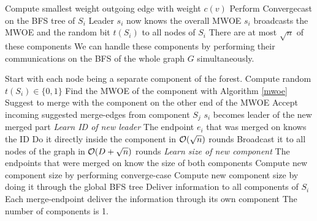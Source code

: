 \documentclass[11pt, oneside]{book}   						%
\begin{document}
\begin{algorithm}
\caption{}\label{mwoe}
\begin{algorithmic}[1]
\ForEach[Component $S_i$]
		\ForEach[node $v$]
			\State Compute smallest weight outgoing edge with weight $c(v)$
		\EndForEach
		\State Perform Convergecast on the BFS tree of $S_i$
		\State Leader $s_i$ now knows the overall MWOE
		\State $s_i$ broadcasts the MWOE and the random bit $t(S_i)$ to all nodes of $S_i$
	\Else
		\State There are at most $\sqrt{n}$ of these components
		\State We can handle these components by performing their communications on the BFS of the whole graph $G$ simultaneously.
	\EndIf
\EndForEach
\end{algorithmic}
\end{algorithm}

\begin{algorithm}[H]
\caption{}\label{boruvska}
\begin{algorithmic}[1]
\State Start with each node being a separate component of the forest.
\Repeat
		\State Compute random $t(S_i)\in \{0,1\}$
		\State Find the MWOE of the component with Algorithm \ref{mwoe}
			\State Suggest to merge with the component on the other end of the MWOE
		\Else 
			\State Accept incoming suggested merge-edges from component $S_j$
			\State $s_i$ becomes leader of the new merged part
		\EndIf
			\State\textit{Learn ID of new leader}
			\State The endpoint $e_i$ that was merged on knows the ID
				\State Do it directly inside the component in $\mathcal{O}(\sqrt{n})$ rounds
			\Else
				\State Broadcast it to all nodes of the graph in $\mathcal{O}(D+\sqrt{n})$ rounds
			\EndIf			
		\EndIf
		\State\textit{Learn size of new component}
			\State The endpoints that were merged on know the size of both components
				\State Compute new component size by performing converge-case
			\Else
				\State Compute new component size by doing it through the global BFS tree
			\EndIf
			\State Deliver information to all components of $S_i$
			\State Each merge-endpoint deliver the information through its own component
		\EndIf
	\EndForEach	
\Until The number of components is 1.
\end{algorithmic}
\end{algorithm}

\end{document}

